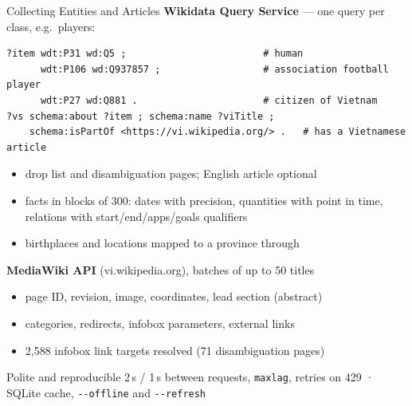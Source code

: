
\begin{frame}[fragile]{Collecting Entities and Articles}
    \textbf{Wikidata Query Service} --- one query per class, e.g.\ players:
\begin{Verbatim}
?item wdt:P31 wd:Q5 ;                        # human
      wdt:P106 wd:Q937857 ;                  # association football player
      wdt:P27 wd:Q881 .                      # citizen of Vietnam
?vs schema:about ?item ; schema:name ?viTitle ;
    schema:isPartOf <https://vi.wikipedia.org/> .   # has a Vietnamese article
\end{Verbatim}
    \begin{itemize}
        \footnotesize
        \item drop list and disambiguation pages; English article optional
        \item facts in blocks of 300: dates \alert{with precision}, quantities with
              point in time, relations with start/end/apps/goals qualifiers
        \item birthplaces and locations mapped to a province through 
    \end{itemize}
    \vspace{0.3em}
    \textbf{MediaWiki API} (vi.wikipedia.org), batches of up to 50 titles
    \begin{itemize}
        \footnotesize
        \item page ID, revision, image, coordinates, lead section (abstract)
        \item categories, redirects, infobox parameters, external links
        \item 2{,}588 infobox link targets resolved (71 disambiguation pages)
    \end{itemize}
    \vspace{0.3em}
    \begin{block}{Polite and reproducible}
        \footnotesize
        2\,s / 1\,s between requests, \texttt{maxlag}, retries on 429 \;·\; SQLite
        cache, \texttt{-{}-offline} and \texttt{-{}-refresh}
    \end{block}
\end{frame}
